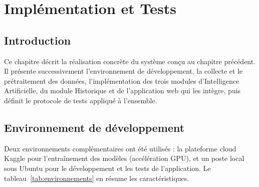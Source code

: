 
\chapter{Implémentation et Tests}
\label{chap:implementation}

\section*{Introduction}

Ce chapitre décrit la réalisation concrète du système conçu au
chapitre précédent. Il présente successivement l'environnement de
développement, la collecte et le prétraitement des données,
l'implémentation des trois modules d'Intelligence Artificielle,
du module Historique et de l'application web qui les intègre,
puis définit le protocole de tests appliqué à l'ensemble.

\section{Environnement de développement}
\label{sec:environnement}

Deux environnements complémentaires ont été utilisés : la
plateforme cloud Kaggle pour l'entraînement des modèles
(accélération GPU), et un poste local sous Ubuntu pour le
développement et les tests de l'application. Le
tableau~\ref{tab:environnements} en résume les caractéristiques.

